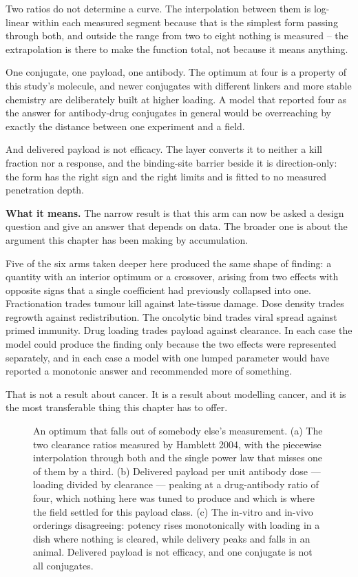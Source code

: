 \documentclass[11pt,twoside,openright]{report}
\begin{document}
\begin{refusal}
Two ratios do not determine a curve. The interpolation between them is log-linear within each measured segment because that is the simplest form passing through both, and outside the range from two to eight nothing is measured -- the extrapolation is there to make the function total, not because it means anything.

One conjugate, one payload, one antibody. The optimum at four is a property of this study's molecule, and newer conjugates with different linkers and more stable chemistry are deliberately built at higher loading. A model that reported four as the answer for antibody-drug conjugates in general would be overreaching by exactly the distance between one experiment and a field.

And delivered payload is not efficacy. The layer converts it to neither a kill fraction nor a response, and the binding-site barrier beside it is direction-only: the form has the right sign and the right limits and is fitted to no measured penetration depth.
\end{refusal}

\textbf{What it means.} The narrow result is that this arm can now be asked a design question and give an answer that depends on data. The broader one is about the argument this chapter has been making by accumulation.

Five of the six arms taken deeper here produced the same shape of finding: a quantity with an interior optimum or a crossover, arising from two effects with opposite signs that a single coefficient had previously collapsed into one. Fractionation trades tumour kill against late-tissue damage. Dose density trades regrowth against redistribution. The oncolytic bind trades viral spread against primed immunity. Drug loading trades payload against clearance. In each case the model could produce the finding only because the two effects were represented separately, and in each case a model with one lumped parameter would have reported a monotonic answer and recommended more of something.

That is not a result about cancer. It is a result about modelling cancer, and it is the most transferable thing this chapter has to offer.

\begin{figure}[tbp]
\setcounter{figure}{36}
\caption{An optimum that falls out of somebody else's measurement. (a) The two clearance ratios measured by Hamblett 2004, with the piecewise interpolation through both and the single power law that misses one of them by a third. (b) Delivered payload per unit antibody dose --- loading divided by clearance --- peaking at a drug-antibody ratio of four, which nothing here was tuned to produce and which is where the field settled for this payload class. (c) The in-vitro and in-vivo orderings disagreeing: potency rises monotonically with loading in a dish where nothing is cleared, while delivery peaks and falls in an animal. Delivered payload is not efficacy, and one conjugate is not all conjugates.}
\label{fig:fig41_adc_loading}
\end{figure}
\end{document}
